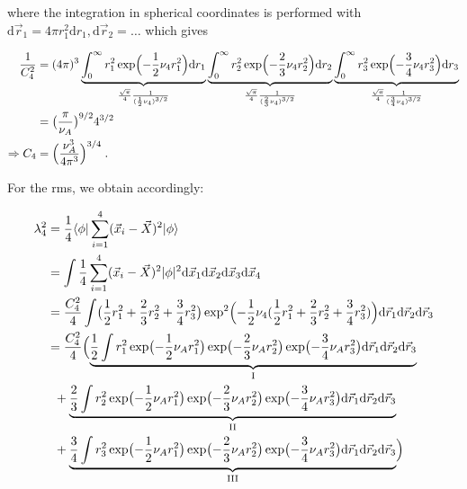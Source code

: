 \documentclass[a4paper,11pt]{scrartcl}
\begin{document}
\begin{appendix}
\noindent where the integration in spherical coordinates is performed with $\mathrm{d}\vec{r}_{1} = 4\pi r_{1}^{2}\mathrm{d}r_{1},  \mathrm{d}\vec{r}_{2} = \ldots$ which gives

\begin{align}
	{1\over C_{4}^{2}} &= (4\pi)^{3} \underbrace{\int_{0}^{\infty} r_{1}^{2}\exp\Bigl(-{1\over 2} \nu_{4}  r_{1}^{2}  \Bigr)  \mathrm{d}r_{1}}_{{\sqrt{\pi} \over 4} {1 \over ({1\over 2} \nu_{4})^{3/2}}  }
							\underbrace{\int_{0}^{\infty} r_{2}^{2}\exp\Bigl(-{2\over 3} \nu_{4}  r_{2}^{2}  \Bigr)  \mathrm{d}r_{2}}_{{\sqrt{\pi} \over 4} {1 \over ({2\over 3} \nu_{4})^{3/2}}  }
							\underbrace{\int_{0}^{\infty} r_{3}^{2}\exp\Bigl(-{3\over 4} \nu_{4}  r_{3}^{2}  \Bigr)  \mathrm{d}r_{3}}_{{\sqrt{\pi} \over 4} {1 \over ({3\over 4} \nu_{4})^{3/2}}  } \\
		&= \bigl({\pi \over \nu_{A}}\bigr)^{9/2} 4^{3/2} \\
	\Rightarrow C_{4} &= \Bigl({\nu_{A}^{3} \over 4 \pi^{3}}\Bigr)^{3/4} \;.
\end{align}

\noindent For the rms, we obtain accordingly:


\begin{align}
	\lambda_{4}^{2} &= {1 \over 4} \langle \phi \vert   \sum_{i=1}^{4}(\vec{x}_{i} - \vec{X})^2 \vert \phi \rangle \\
	&= \int {1\over 4}  \sum_{i=1}^{4}(\vec{x}_{i} - \vec{X})^2 |\phi|^2 \mathrm{d}\vec{x}_{1}\mathrm{d}\vec{x}_{2}\mathrm{d}\vec{x}_{3}\mathrm{d}\vec{x}_{4} \\
	 &= {C_4^2 \over 4}  \int \bigl({1\over 2}r_{1}^{2} + {2\over 3} r_{2}^{2} + {3\over 4}r_{3}^{2} \bigr) \exp^{2}\Bigl(-{1\over 2} \nu_{4} ({1\over 2}r_{1}^{2} + {2\over 3} r_{2}^{2} + {3\over 4}r_{3}^{2}) \Bigr) \mathrm{d}\vec{r}_{1}\mathrm{d}\vec{r}_{2}\mathrm{d}\vec{r}_{3} \\
	&= {C_4^2 \over 4} \Bigl(\underbrace{{1\over 2} \int r_{1}^2 \exp\bigl(-{1\over2} \nu_A r_{1}^{2}\bigr) \exp\bigl(-{2\over3} \nu_A r_{2}^{2}\bigr) \exp\bigl(-{3\over4} \nu_A r_{3}^{2}\bigr) \mathrm{d}\vec{r}_{1}\mathrm{d}\vec{r}_{2}\mathrm{d}\vec{r}_{3}}_{\mathrm{I}} \\
	&\;\;+ \underbrace{{2\over 3} \int r_{2}^2 \exp\bigl(-{1\over2} \nu_A r_{1}^{2}\bigr) \exp\bigl(-{2\over3} \nu_A r_{2}^{2}\bigr) \exp\bigl(-{3\over4} \nu_A r_{3}^{2}\bigr) \mathrm{d}\vec{r}_{1}\mathrm{d}\vec{r}_{2}\mathrm{d}\vec{r}_{3}}_{\mathrm{II}} \\
	&\;\;+ \underbrace{{3\over 4} \int r_{3}^2 \exp\bigl(-{1\over2} \nu_A r_{1}^{2}\bigr) \exp\bigl(-{2\over3} \nu_A r_{2}^{2}\bigr) \exp\bigl(-{3\over4} \nu_A r_{3}^{2}\bigr) \mathrm{d}\vec{r}_{1}\mathrm{d}\vec{r}_{2}\mathrm{d}\vec{r}_{3}}_{\mathrm{III}}
				 \Bigr)
\end{align}


\end{appendix}
\end{document}
